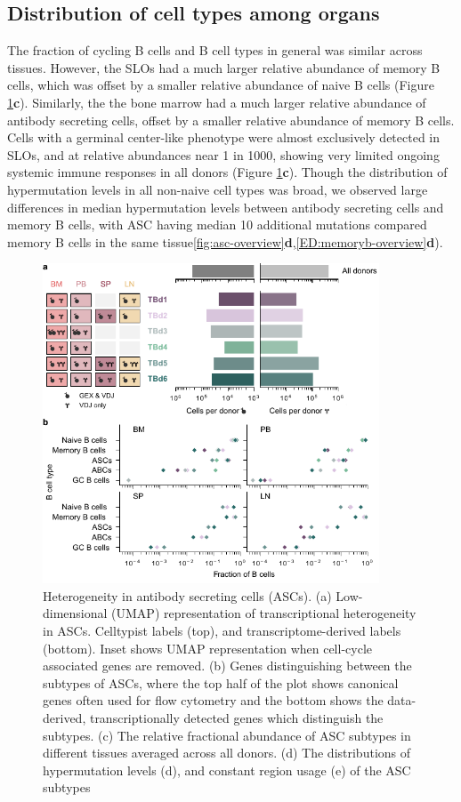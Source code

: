 \subsection{Distribution of cell types among organs}
The fraction of cycling B cells and B cell types in general was similar across tissues. However, the SLOs had a much larger relative abundance of memory B cells, which was offset by a smaller relative abundance of naive B cells (Figure \ref{fig:study-overview}\textbf{c}). Similarly, the the bone marrow had a much larger relative abundance of antibody secreting cells, offset by a smaller relative abundance of memory B cells. Cells with a germinal center-like phenotype were almost exclusively detected in SLOs, and at relative abundances near 1 in 1000, showing very limited ongoing systemic immune responses in all donors  (Figure \ref{fig:study-overview}\textbf{c}). Though the distribution of hypermutation levels in all  non-naive cell types was broad, we observed large differences in median hypermutation levels between antibody secreting cells and memory B cells, with ASC having median 10 additional mutations compared memory B cells in the same tissue\ref{fig:asc-overview}\textbf{d},\ref{ED:memoryb-overview}\textbf{d}).   
\begin{figure}
    \centering
    \includegraphics[width=10cm]{figs/Tabula_Bursa/Figure1_ab_antibody_version.pdf}

    \caption[\textit{In vivo} study overview]{Heterogeneity in antibody secreting cells (ASCs). (a) Low-dimensional (UMAP) representation of transcriptional heterogeneity in ASCs. Celltypist labels (top), and transcriptome-derived labels (bottom). Inset shows UMAP representation when cell-cycle associated genes are removed. (b) Genes distinguishing between the subtypes of ASCs, where the top half of the plot shows canonical genes often used for flow cytometry and the bottom shows the data-derived, transcriptionally detected genes which distinguish the subtypes. (c) The relative fractional abundance of ASC subtypes in different tissues averaged across all donors. (d) The distributions of  hypermutation levels (d),  and constant region usage (e) of the ASC subtypes}
    \label{fig:study-overview}
\end{figure}
